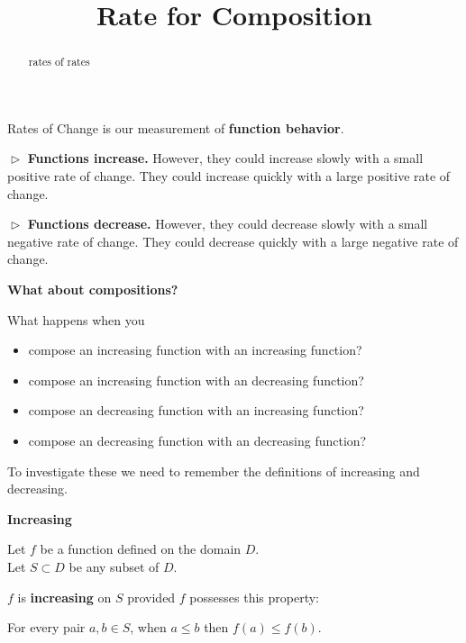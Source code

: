 \documentclass{ximera}
\title{Rate for Composition}
\begin{document}
\begin{abstract}
rates of rates
\end{abstract}
\maketitle




Rates of Change is our measurement of \textbf{function behavior}.


$\vartriangleright$  \textbf{\textcolor{blue!55!black}{Functions increase.}}  However, they could increase slowly with a small positive rate of change.  They could increase quickly with a large positive rate of change. 



$\vartriangleright$  \textbf{\textcolor{blue!55!black}{Functions decrease.}}  However, they could decrease slowly with a small negative rate of change.  They could decrease quickly with a large negative rate of change. 





\textbf{\textcolor{purple!85!blue}{What about compositions?}}





What happens when you


\begin{itemize}
\item compose an increasing function with an increasing function?
\item compose an increasing function with an decreasing function?
\item compose an decreasing function with an increasing function?
\item compose an decreasing function with an decreasing function?
\end{itemize}



To investigate these we need to remember the definitions of increasing and decreasing.






\begin{summary} \textbf{\textcolor{green!50!black}{Increasing}} 


Let $f$ be a function defined on the domain $D$. \\
Let $S \subset D$ be any subset of $D$.

$f$ is \textbf{increasing} on $S$ provided $f$ possesses this property:  


\begin{center}
For every pair $a, b \in S$, when $a \leq b$ then $f(a) \leq f(b)$.
\end{center}

\end{summary}
\end{document}
